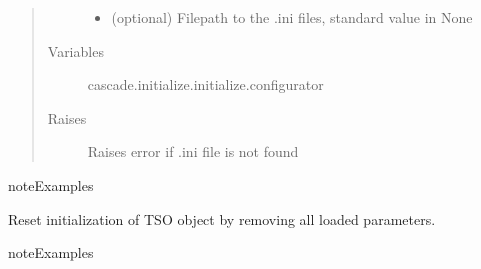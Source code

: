 \documentclass[a4paper,11pt,english]{sphinxmanual}
\begin{document}
\begin{fulllineitems}
\begin{fulllineitems}
\begin{quote}
\begin{description}
\begin{itemize}
\item {} 
 \textendash{} (optional) Filepath to the .ini files, standard value in None

\end{itemize}

\item[{Variables}] \leavevmode
{} \textendash{} cascade.initialize.initialize.configurator

\item[{Raises}] \leavevmode
{} \textendash{} Raises error if .ini file is not found

\end{description}\end{quote}

\begin{sphinxadmonition}{note}{Examples}

%
\begin{sphinxVerbatim}[commandchars=\\\{\}]
 
\end{sphinxVerbatim}
\end{sphinxadmonition}

\end{fulllineitems}


\begin{fulllineitems}
\label{\detokenize{cascade.TSO:cascade.TSO.TSO.TSOSuite.reset_TSO}}
Reset initialization of TSO object by removing all loaded parameters.

\begin{sphinxadmonition}{note}{Examples}

%
\begin{sphinxVerbatim}[commandchars=\\\{\}]
\end{sphinxVerbatim}
\end{sphinxadmonition}


\end{fulllineitems}
\end{fulllineitems}
\end{document}
